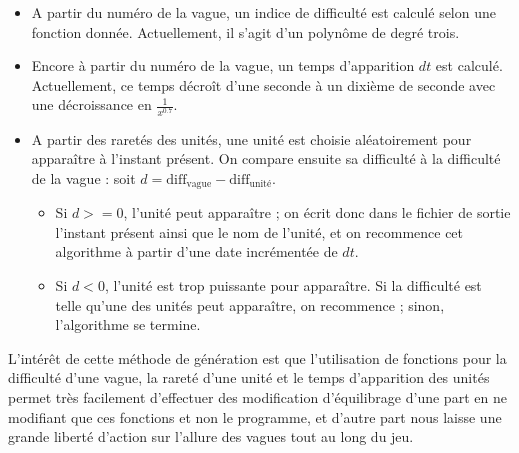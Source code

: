 \documentclass[a4paper,11pt]{article}
\begin{document}
\begin{itemize}
\item A partir du numéro de la vague, un indice de difficulté est calculé selon une fonction donnée. Actuellement, il s'agit d'un polynôme de degré trois.
\item Encore à partir du numéro de la vague, un temps d'apparition $dt$ est calculé. Actuellement, ce temps décroît d'une seconde à un dixième de seconde avec une décroissance en $\frac{1}{x^{0.7}}$.
\item A partir des raretés des unités, une unité est choisie aléatoirement pour apparaître à l'instant présent. On compare ensuite sa difficulté à la difficulté de la vague : soit $d = \text{diff}_{\text{vague}} - \text{diff}_{\text{unité}}$.
  \begin{itemize}
  \item Si $d >= 0$, l'unité peut apparaître ; on écrit donc dans le fichier de sortie l'instant présent ainsi que le nom de l'unité, et on recommence cet algorithme à partir d'une date incrémentée de $dt$.
  \item Si $d < 0$, l'unité est trop puissante pour apparaître. Si la difficulté est telle qu'une des unités peut apparaître, on recommence ; sinon, l'algorithme se termine.
  \end{itemize}
\end{itemize}

L'intérêt de cette méthode de génération est que l'utilisation de fonctions pour la difficulté d'une vague, la rareté d'une unité et le temps d'apparition des unités permet très facilement d'effectuer des modification d'équilibrage d'une part en ne modifiant que ces fonctions et non le programme, et d'autre part nous laisse une grande liberté d'action sur l'allure des vagues tout au long du jeu.

\end{document}
